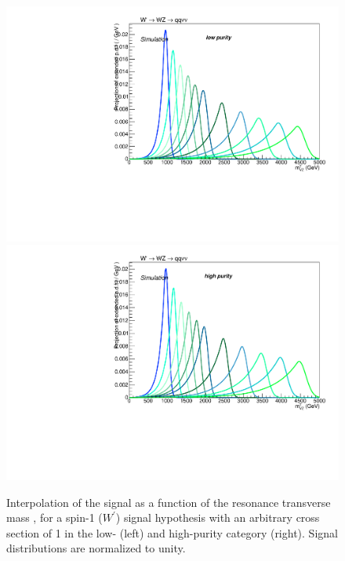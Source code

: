 \begin{figure}[!htb]
  \centering
    \includegraphics[width=.495\textwidth]{plotsAlpha_tesi/XVZnnlp/XWZInv_Signal.pdf}
    \includegraphics[width=.495\textwidth]{plotsAlpha_tesi/XVZnnhp/XWZInv_Signal.pdf}
  \caption{Interpolation of the signal as a function of the resonance transverse mass \mtVZ, for a spin-1 ($W^{'}$) signal hypothesis with an arbitrary cross section of 1 \pb in the low- (left) and high-purity category (right). Signal distributions are normalized to unity.}
  \label{fig:XWZInv_Signal}
\end{figure}




